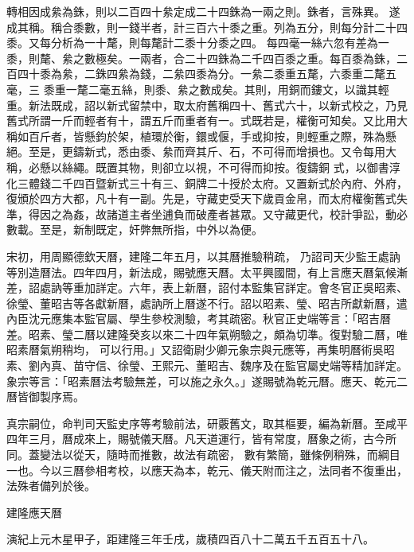 \begin{pinyinscope}
{  轉相因成絫為銖，則以二百四十絫定成二十四銖為一兩之則。銖者，言殊異。}
 遂成其稱。稱合黍數，則一錢半者，計三百六十黍之重。列為五分，則每分計二十四黍。又每分析為一十氂，則每氂計二黍十分黍之四。
 每四毫一絲六忽有差為一黍，則氂、絫之數極矣。一兩者，合二十四銖為二千四百黍之重。每百黍為銖，二百四十黍為絫，二銖四絫為錢，二絫四黍為分。一絫二黍重五氂，六黍重二氂五毫，三
 黍重一氂二毫五絲，則黍、絫之數成矣。其則，用銅而鏤文，以識其輕重。新法既成，詔以新式留禁中，取太府舊稱四十、舊式六十，以新式校之，乃見舊式所謂一斤而輕者有十，謂五斤而重者有一。式既若是，權衡可知矣。又比用大稱如百斤者，皆懸鈞於架，植環於衡，鐶或偃，手或抑按，則輕重之際，殊為懸絕。至是，更鑄新式，悉由黍、絫而齊其斤、石，不可得而增損也。又令每用大稱，必懸以絲繩。既置其物，則卻立以視，不可得而抑按。復鑄銅
 式，以御書淳化三體錢二千四百暨新式三十有三、銅牌二十授於太府。又置新式於內府、外府，復頒於四方大都，凡十有一副。先是，守藏吏受天下歲貢金帛，而太府權衡舊式失準，得因之為姦，故諸道主者坐逋負而破產者甚眾。又守藏更代，校計爭訟，動必數載。至是，新制既定，奸弊無所指，中外以為便。



 宋初，用周顯德欽天曆，建隆二年五月，以其曆推驗稍疏，
 乃詔司天少監王處訥等別造曆法。四年四月，新法成，賜號應天曆。太平興國間，有上言應天曆氣候漸差，詔處訥等重加詳定。六年，表上新曆，詔付本監集官詳定。會冬官正吳昭素、徐瑩、董昭吉等各獻新曆，處訥所上曆遂不行。詔以昭素、瑩、昭吉所獻新曆，遣內臣沈元應集本監官屬、學生參校測驗，考其疏密。秋官正史端等言：「昭吉曆差。昭素、瑩二曆以建隆癸亥以來二十四年氣朔驗之，頗為切準。復對驗二曆，唯昭素曆氣朔稍均，
 可以行用。」又詔衛尉少卿元象宗與元應等，再集明曆術吳昭素、劉內真、苗守信、徐瑩、王熙元、董昭吉、魏序及在監官屬史端等精加詳定。象宗等言：「昭素曆法考驗無差，可以施之永久。」遂賜號為乾元曆。應天、乾元二曆皆御製序焉。



 真宗嗣位，命判司天監史序等考驗前法，研覈舊文，取其樞要，編為新曆。至咸平四年三月，曆成來上，賜號儀天曆。凡天道運行，皆有常度，曆象之術，古今所同。蓋變法以從天，隨時而推數，故法有疏密，
 數有繁簡，雖條例稍殊，而綱目一也。今以三曆參相考校，以應天為本，乾元、儀天附而注之，法同者不復重出，法殊者備列於後。



 建隆應天曆


演紀上元木星甲子，距建隆三年壬戌，歲積四百八十二萬五千五百五十八。




\end{pinyinscope}
